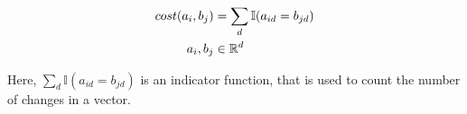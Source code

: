 \documentclass[./../../paper.tex]{subfiles}
\begin{document}
\begin{align}
    \label{eq:sparcity}                          
    cost(a_i, b_j)      & = \sum_d \mathbb{I}(a_{id} = b_{jd})  \\ 
    a_i,b_j        & \in \mathbb{R}^d \nonumber 
\end{align}

\noindent Here, $\sum_d \mathbb{I}(a_{id} = b_{jd})$ is an indicator function, that is used to count the number of changes in a vector.




\end{document}
